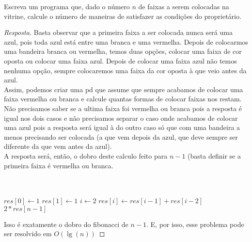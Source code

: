 \documentclass[12pt]{article}
\newenvironment{problem}[2][Ex]{\begin{trivlist}
\item[\hskip \labelsep {\bfseries #1}\hskip \labelsep {\bfseries #2.}]}{\end{trivlist}}
\begin{document}
\begin{problem}{21}
Escreva um programa que, dado o número $n$ de faixas a serem colocadas na vitrine, calcule o número de maneiras de satisfazer as condições do proprietário.
\end{problem}

\begin{proof}[Resposta]
Basta observar que a primeira faixa a ser colocada nunca será uma azul, pois toda azul está entre uma branca e uma vermelha. Depois de colocarmos uma bandeira branca ou vermelha, temos duas opções, colocar uma faixa de cor oposta ou colocar uma faixa azul. Depois de colocar uma faixa azul não temos nenhuma opção, sempre colocaremos uma faixa da cor oposta à que veio antes da azul. \\
Assim, podemos criar uma pd que assume que sempre acabamos de colocar uma faixa vermelha ou branca e calcule quantas formas de colocar faixas nos restam. Não precisamos saber se a ultima faixa foi vermelha ou branca pois a resposta é igual nos dois casos e não precisamos separar o caso onde acabamos de colocar uma azul pois a resposta será igual à do outro caso só que com uma bandeira a menos precisando ser colocada (a que vem depois da azul, que deve sempre ser diferente da que vem antes da azul). \\
A resposta será, então, o dobro deste calculo feito para $n-1$ (basta definir se a primeira faixa é vermelha ou branca. \\
\\
\\

\begin{algorithmic}[1]
    \State $res[0] \gets 1$
    \State $res[1] \gets 1$
    \State $i \gets 2$
        \State $res[i] \gets res[i-1] + res[i-2]$
    \EndWhile
    \State \Return $2*res[n-1]$
\EndFunction
\end{algorithmic}

Isso é exatamente o dobro do fibonacci de $n-1$. E, por isso, esse problema pode ser resolvido em $O(\lg(n))$

\end{proof}
\end{document}
